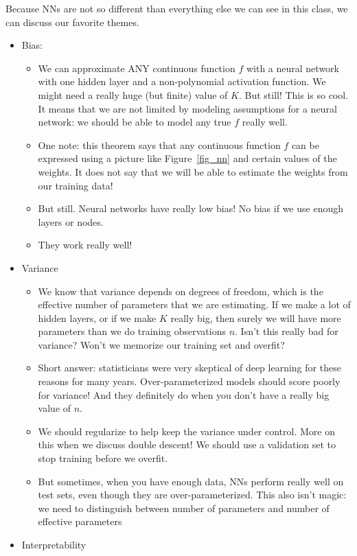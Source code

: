 Because NNs are not so different than everything else we can see in this class, we can discuss our favorite themes. 
\begin{itemize}
\item Bias:
\begin{itemize}
\item  We can approximate ANY continuous function $f$ with a neural network with one hidden layer and a non-polynomial activation function. We might need a really huge (but finite) value of $K$. But still! This is so cool. It means that we are not limited by modeling assumptions for a neural network: we should be able to model any true $f$ really well.
\item One note: this theorem	 says that any continuous function $f$ can be expressed using a picture like Figure~\ref{fig_nn} and certain values of the weights. It does not say that we will be able to estimate the weights from our training data! 
\item But still. Neural networks have really low bias! No bias if we use enough layers or nodes. 
\item They work really well!
\end{itemize}
\item Variance
\begin{itemize}
\item We know that variance depends on degrees of freedom, which is the effective number of parameters that we are estimating. If we make a lot of hidden layers, or if we make $K$ really big, then surely we will have more parameters than we do training observations $n$. Isn't this really bad for variance? Won't we memorize our training set and overfit?
\item Short answer: statisticians were very skeptical of deep learning for these reasons for many years. Over-parameterized models should score poorly for variance! And they definitely do when you don't have a really big value of $n$. 
\item We should regularize to help keep the variance under control. More on this when we discuss double descent! We should use a validation set to stop training before we overfit.
\item But sometimes, when you have enough data, NNs perform really well on test sets, even though they are over-parameterized. This also isn't magic: we need to distinguish between number of parameters and number of effective parameters
\end{itemize}
\item Interpretability

\end{itemize}
